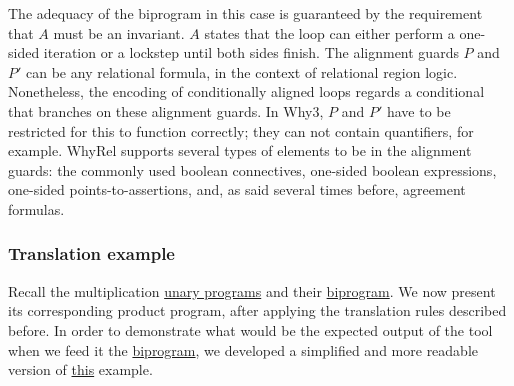 The adequacy of the biprogram in this case is guaranteed by the requirement that $A$ must be an invariant.
$A$ states that the loop can either perform a one-sided iteration or a lockstep until both sides finish.
The alignment guards $P$ and $P'$ can be any relational formula, in the context of relational region logic.
Nonetheless, the encoding of conditionally aligned loops regards a conditional that branches on these alignment guards.
In Why3, $P$ and $P'$ have to be restricted for this to function correctly; they can not contain quantifiers, for example.
WhyRel supports several types of elements to be in the alignment guards: the commonly used boolean connectives, one-sided boolean expressions, one-sided points-to-assertions, and, as said several times before, agreement formulas.


\subsubsection{Translation example}
\label{subsubsec:whyrel_translation_example}

Recall the multiplication \hyperref[fig:mult_source_programs]{unary programs} and their \hyperref[fig:mult_biprogram]{biprogram}.
We now present its corresponding product program, after applying the translation rules described before.
In order to demonstrate what would be the expected output of the tool when we feed it the \hyperref[fig:mult_biprogram]{biprogram}, we developed a simplified and more readable version of \href{https://github.com/dnaumann/RelRL/blob/main/examples/equiv-check/example.mlw}{this} example.

